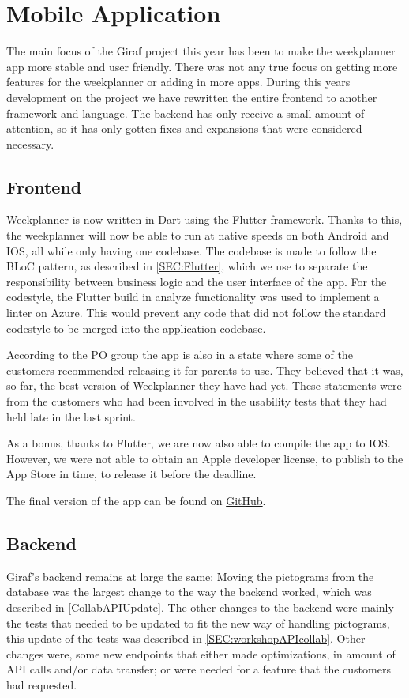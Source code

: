 \section{Mobile Application}
The main focus of the Giraf project this year has been to make the weekplanner app more stable and user friendly.
There was not any true focus on getting more features for the weekplanner or adding in more apps.
During this years development on the project we have rewritten the entire frontend to another framework and language.
The backend has only receive a small amount of attention, so it has only gotten fixes and expansions that were considered necessary.

\subsection{Frontend}
Weekplanner is now written in Dart using the Flutter framework.
Thanks to this, the weekplanner will now be able to run at native speeds on both Android and IOS, all while only having one codebase.
The codebase is made to follow the BLoC pattern, as described in \autoref{SEC:Flutter}, which we use to separate the responsibility between business logic and the user interface of the app. 
For the codestyle, the Flutter build in analyze functionality was used to implement a linter on Azure. 
This would prevent any code that did not follow the standard codestyle to be merged into the application codebase.

According to the PO group the app is also in a state where some of the customers recommended releasing it for parents to use.
They believed that it was, so far, the best version of Weekplanner they have had yet.
These statements were from the customers who had been involved in the usability tests that they had held late in the last sprint.

As a bonus, thanks to Flutter, we are now also able to compile the app to IOS.
However, we were not able to obtain an Apple developer license, to publish to the App Store in time, to release it before the deadline.

The final version of the app can be found on \href{https://github.com/aau-giraf/weekplanner/tree/2019-Final}{GitHub}.


\subsection{Backend}
Giraf's backend remains at large the same; Moving the pictograms from the database was the largest change to the way the backend worked, which was described in \autoref{CollabAPIUpdate}.
The other changes to the backend were mainly the tests that needed to be updated to fit the new way of handling pictograms, this update of the tests was described in \autoref{SEC:workshopAPIcollab}.
Other changes were, some new endpoints that either made optimizations, in amount of API calls and/or data transfer; or were needed for a feature that the customers had requested.

